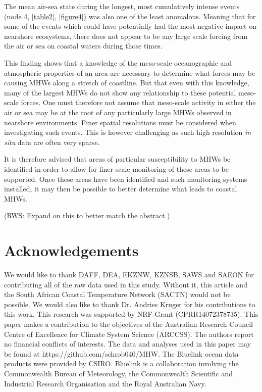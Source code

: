 \documentclass[a4paper,10pt,review]{elsarticle}
\begin{document}
The mean air-sea state during the longest, most cumulatively intense events (node 4, \cref{table2}, \cref{figure4}) was also one of the least anomalous. Meaning that for some of the events which could have potentially had the most negative impact on nearshore ecosystems, there does not appear to be any large scale forcing from the air or sea on coastal waters during those times.

This finding shows that a knowledge of the meso-scale oceanographic and atmospheric properties of an area are necessary to determine what forces may be causing MHWs along a stretch of coastline. But that even with this knowledge, many of the largest MHWs do not show any relationship to these potential meso-scale forces. One must therefore not assume that meso-scale activity in either the air or sea may be at the root of any particularly large MHWs observed in nearshore environments. Finer spatial resolutions must be considered when investigating such events. This is however challenging as such high resolution \emph{in situ} data are often very sparse.

It is therefore advised that areas of particular susceptibility to MHWs be identified in order to allow for finer scale monitoring of these areas to be supported. Once these areas have been identified and such monitoring systems installed, it may then be possible to better determine what leads to coastal MHWs. 

(RWS: Expand on this to better match the abstract.)

\section*{Acknowledgements}
We would like to thank DAFF, DEA, EKZNW, KZNSB, SAWS and SAEON for contributing all of the raw data used in this study. Without it, this article and the South African Coastal Temperature Network (SACTN) would not be possible. We would also like to thank Dr. Andries Kruger for his contributions to this work. This research was supported by NRF Grant (CPRR14072378735). This paper makes a contribution to the objectives of the Australian Research Council Centre of Excellence for Climate System Science (ARCCSS). The authors report no financial conflicts of interests. The data and analyses used in this paper may be found at https://github.com/schrob040/MHW. The Bluelink ocean data products were provided by CSIRO. Bluelink is a collaboration involving the Commonwealth Bureau of Meteorology, the Commonwealth Scientific and Industrial Research Organisation and the Royal Australian Navy.
\end{document}
